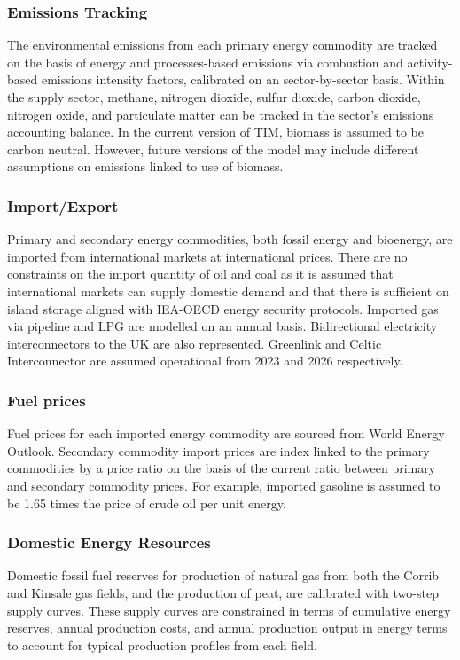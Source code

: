 \documentclass[gmd,manuscript]{copernicus}
\begin{document}
\subsubsection{Emissions Tracking}
The environmental emissions from each primary energy commodity are tracked on the basis of energy and processes-based emissions via combustion and activity-based emissions intensity factors, calibrated on an sector-by-sector basis. Within the supply sector, methane, nitrogen dioxide, sulfur dioxide, carbon dioxide, nitrogen oxide, and particulate matter can be tracked in the sector's emissions accounting balance. In the current version of TIM, biomass is assumed to be carbon neutral. However, future versions of the model may include different assumptions on emissions linked to use of biomass. 

\subsubsection{Import/Export}
Primary and secondary energy commodities, both fossil energy and bioenergy, are imported from international markets at international prices. There are no constraints on the import quantity of oil and coal as it is assumed that international markets can supply domestic demand and that there is sufficient on island storage aligned with IEA-OECD energy security protocols. Imported gas via pipeline and LPG are modelled on an annual basis. Bidirectional electricity interconnectors to the UK are also represented. Greenlink and Celtic Interconnector are assumed operational from 2023 and 2026 respectively.

\subsubsection{Fuel prices}
Fuel prices for each imported energy commodity are sourced from \citet{IEA2019,InternationalEnergyAgency2020} World Energy Outlook. Secondary commodity import prices are index linked to the primary commodities by a price ratio on the basis of the current ratio between primary and secondary commodity prices. For example, imported gasoline is assumed to be 1.65 times the price of crude oil per unit energy.


\subsubsection{Domestic Energy Resources}
Domestic fossil fuel reserves for production of natural gas from both the Corrib and Kinsale gas fields, and the production of peat, are calibrated with two-step supply curves. These supply curves are constrained in terms of cumulative energy reserves, annual production costs, and annual production output in energy terms to account for typical production profiles from each field.
\end{document}
